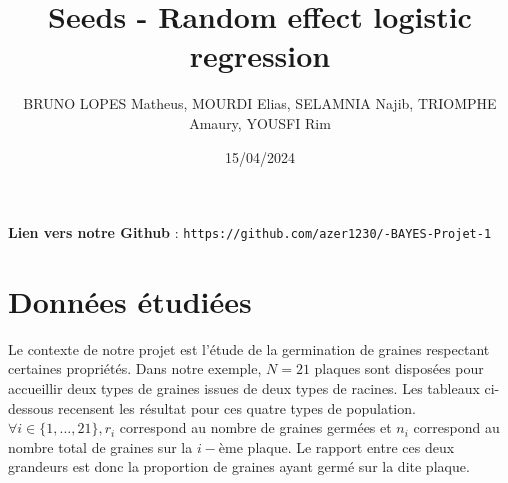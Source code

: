 \documentclass[
]{article}
\title{Seeds - Random effect logistic regression}
\author{BRUNO LOPES Matheus, MOURDI Elias, SELAMNIA Najib, TRIOMPHE
Amaury, YOUSFI Rim}
\date{15/04/2024}
\begin{document}
\maketitle

\textbf{Lien vers notre Github} :
\texttt{https://github.com/azer1230/-BAYES-Projet-1}

\hypertarget{donnuxe9es-uxe9tudiuxe9es}{%
\section{Données étudiées}\label{donnuxe9es-uxe9tudiuxe9es}}

Le contexte de notre projet est l'étude de la germination de graines
respectant certaines propriétés. Dans notre exemple, \(N = 21\) plaques
sont disposées pour accueillir deux types de graines issues de deux
types de racines. Les tableaux ci-dessous recensent les résultat pour
ces quatre types de population. \(\forall i \in \{1,...,21\}, r_i\)
correspond au nombre de graines germées et \(n_i\) correspond au nombre
total de graines sur la \(i-\)ème plaque. Le rapport entre ces deux
grandeurs est donc la proportion de graines ayant germé sur la dite
plaque.
\end{document}
